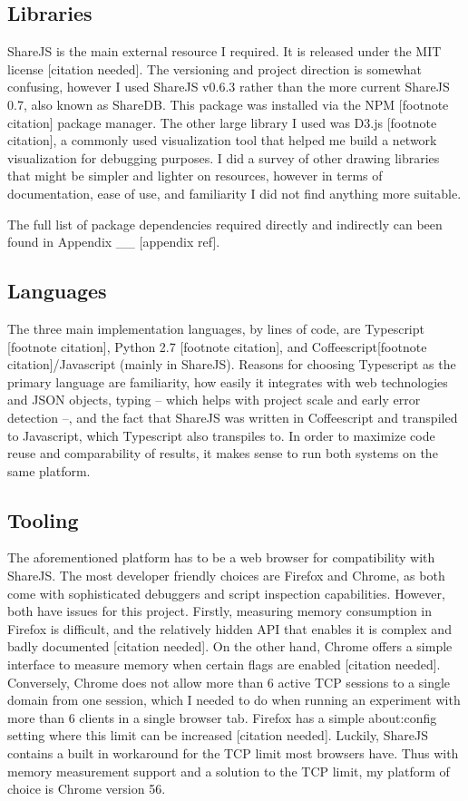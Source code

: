 \documentclass[12pt,a4paper,twoside,openright]{report}
\begin{document}
	\subsection{Libraries}
	ShareJS is the main external resource I required. It is released under the MIT license [citation needed]. The versioning and project direction is somewhat confusing, however I used ShareJS v0.6.3 rather than the more current ShareJS 0.7, also known as ShareDB. This package was installed via the NPM [footnote citation] package manager. The other large library I used was D3.js [footnote citation], a commonly used visualization tool that helped me build a network visualization for debugging purposes. I did a survey of other drawing libraries that might be simpler and lighter on resources, however in terms of documentation, ease of use, and familiarity I did not find anything more suitable.
	
	The full list of package dependencies required directly and indirectly can been found in Appendix __ [appendix ref].
	
	\subsection{Languages}
	The three main implementation languages, by lines of code, are Typescript [footnote citation], Python 2.7 [footnote citation], and Coffeescript[footnote citation]/Javascript  (mainly in ShareJS). Reasons for choosing Typescript as the primary language are familiarity, how easily it integrates with web technologies and JSON objects, typing -- which helps with project scale and early error detection --, and the fact that ShareJS was written in Coffeescript and transpiled to Javascript, which Typescript also transpiles to. In order to maximize code reuse and comparability of results, it makes sense to run both systems on the same platform.
	
	\subsection{Tooling}
	The aforementioned platform has to be a web browser for compatibility with ShareJS. The most developer friendly choices are Firefox and Chrome, as both come with sophisticated debuggers and script inspection capabilities. However, both have issues for this project. Firstly, measuring memory consumption in Firefox is difficult, and the relatively hidden API that enables it is complex and badly documented [citation needed]. On the other hand, Chrome offers a simple interface to measure memory when certain flags are enabled [citation needed]. Conversely, Chrome does not allow more than 6 active TCP sessions to a single domain from one session, which I needed to do when running an experiment with more than 6 clients in a single browser tab. Firefox has a simple about:config setting where this limit can be increased [citation needed]. Luckily, ShareJS contains a built in workaround for the TCP limit most browsers have. Thus with memory measurement support and a solution to the TCP limit, my platform of choice is Chrome version 56.
	
\end{document}

